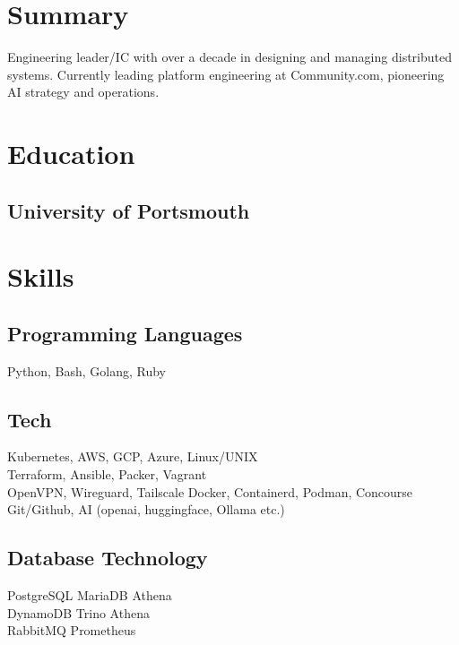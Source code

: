 \documentclass[]{resume}
\begin{document}
\hfill
\begin{minipage}[t]{0.33\textwidth}


\section{Summary}
Engineering leader/IC with over a decade in designing and managing distributed systems. Currently leading platform engineering at Community.com, pioneering AI strategy and operations. 
\sectionsep


\section{Education}

\subsection{University of Portsmouth}
\sectionsep


\section{Skills}
\subsection{Programming Languages}
Python, Bash, Golang, Ruby
\sectionsep

\subsection{Tech}
Kubernetes, AWS, GCP, Azure, Linux/UNIX \\
Terraform, Ansible, Packer, Vagrant \\
OpenVPN, Wireguard, Tailscale
Docker, Containerd, Podman, Concourse  \\
Git/Github, AI (openai, huggingface, Ollama etc.) \\
\sectionsep

\subsection{Database Technology}
PostgreSQL \textbullet{} MariaDB \textbullet{} Athena \\
DynamoDB \textbullet{} Trino \textbullet{} Athena \\ 
RabbitMQ \textbullet{} Prometheus \\
\sectionsep


\end{minipage}
\end{document}
